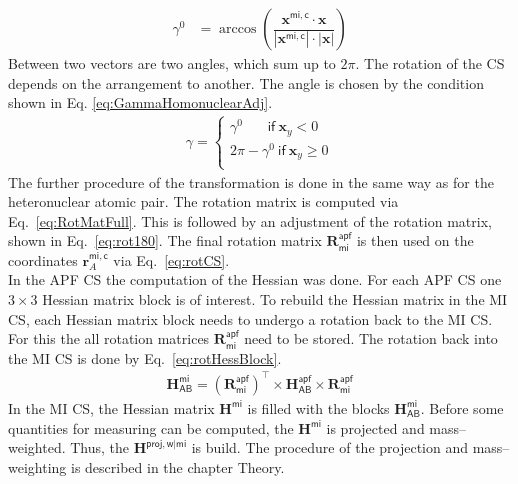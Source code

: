 \begin{align}
	\label{eq:GammaHomonuclear}
		\gamma^{0} &= \arccos{ \left( \dfrac{\textbf{x}^\mathsf{mi,c} \cdot  \textbf{x}}{|\textbf{x}^\mathsf{mi,c}|\cdot |\textbf{x}|}\right) }
\end{align}
Between two vectors are two angles, which sum up to $2\pi$.
The rotation of the CS depends on the arrangement to another.
The angle is chosen by the condition shown in Eq. \eqref{eq:GammaHomonuclearAdj}.
\begin{align}
	\label{eq:GammaHomonuclearAdj}
	\gamma = \begin{cases}
		\gamma^0 ~~~~~~~~\mathsf{if}~ \textbf{x}_y < 0\\
		2\pi - \gamma^0  ~\mathsf{if}~ \textbf{x}_y \geq 0 \\
		   \end{cases} 
\end{align}
The further procedure of the transformation is done in the same way as for the heteronuclear atomic pair.
The rotation matrix is computed via Eq.~\eqref{eq:RotMatFull}.
This is followed by an adjustment of the rotation matrix,
shown in Eq.~\eqref{eq:rot180}.
The final rotation matrix $\textbf{R}_\mathsf{mi}^\mathsf{apf}$ is then
used on the coordinates $ \textbf{r}^\mathsf{mi,c}_A$ via Eq.~\eqref{eq:rotCS}.\\
In the APF CS the computation of the Hessian was done. For each APF CS one $3\times 3$ Hessian matrix block is of interest.
To rebuild the Hessian matrix in the MI CS, each Hessian matrix block needs to undergo a rotation back to the MI CS.
For this the all rotation matrices $\textbf{R}_\mathsf{mi}^\mathsf{apf}$ need to be stored.
The rotation back into the MI CS is done by Eq.~\eqref{eq:rotHessBlock}.
\begin{align}
	\label{eq:rotHessBlock}
	\textbf{H}^\mathsf{mi}_\mathsf{AB} = {\left(\textbf{R}_\mathsf{mi}^\mathsf{apf}\right)}^\intercal
	 \times \textbf{H}^\mathsf{apf}_\mathsf{AB} \times  \textbf{R}_\mathsf{mi}^\mathsf{apf}
\end{align}
In the MI CS, the Hessian matrix $\textbf{H}^\mathsf{mi}$ is filled with the blocks $\textbf{H}^\mathsf{mi}_\mathsf{AB}$.
Before some quantities for measuring can be computed, the $\textbf{H}^\mathsf{mi}$ is projected and mass--weighted.
Thus, the $\textbf{H}^\mathsf{proj,w|mi}$ is build. 
The procedure of the projection and mass--weighting is described in the chapter Theory.

%  
\newpage
